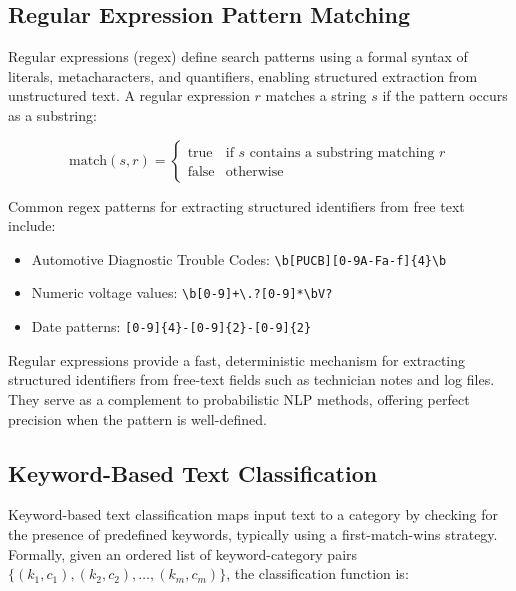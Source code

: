 \documentclass[10pt,a4paper]{article}
\begin{document}
\subsection{Regular Expression Pattern Matching}
\label{sec:regex}

Regular expressions (regex) define search patterns using a formal syntax of literals, metacharacters, and quantifiers, enabling structured extraction from unstructured text. A regular expression $r$ matches a string $s$ if the pattern occurs as a substring:

\begin{equation}
\text{match}(s, r) = \begin{cases} \text{true} & \text{if } s \text{ contains a substring matching } r \\ \text{false} & \text{otherwise} \end{cases}
\label{eq:regex-match}
\end{equation}

Common regex patterns for extracting structured identifiers from free text include:

\begin{itemize}
    \item Automotive Diagnostic Trouble Codes: \texttt{\textbackslash b[PUCB][0-9A-Fa-f]\{4\}\textbackslash b}
    \item Numeric voltage values: \texttt{\textbackslash b[0-9]+\textbackslash.?[0-9]*\textbackslash bV?}
    \item Date patterns: \texttt{[0-9]\{4\}-[0-9]\{2\}-[0-9]\{2\}}
\end{itemize}

Regular expressions provide a fast, deterministic mechanism for extracting structured identifiers from free-text fields such as technician notes and log files. They serve as a complement to probabilistic NLP methods, offering perfect precision when the pattern is well-defined.

\subsection{Keyword-Based Text Classification}
\label{sec:keyword-classification}

Keyword-based text classification maps input text to a category by checking for the presence of predefined keywords, typically using a first-match-wins strategy. Formally, given an ordered list of keyword-category pairs $\{(k_1, c_1), (k_2, c_2), \ldots, (k_m, c_m)\}$, the classification function is:
\end{document}
